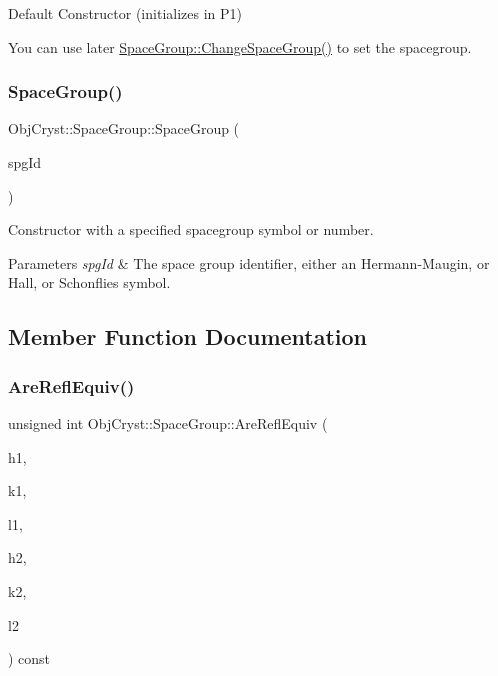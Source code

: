Default Constructor (initializes in P1)

You can use later \mbox{\hyperlink{class_obj_cryst_1_1_space_group_af592aa42f04d02e4caecbf2b93031be8}{Space\+Group\+::\+Change\+Space\+Group()}} to set the spacegroup. \mbox{\label{class_obj_cryst_1_1_space_group_a5db1daaae23fab45637555f74c705b3e}} 
\subsubsection{\texorpdfstring{SpaceGroup()}{SpaceGroup()}\hspace{0.1cm}{\footnotesize\ttfamily [2/2]}}
{\footnotesize\ttfamily Obj\+Cryst\+::\+Space\+Group\+::\+Space\+Group (\begin{DoxyParamCaption}\item[{const string \&}]{spg\+Id }\end{DoxyParamCaption})}



Constructor with a specified spacegroup symbol or number. 


\begin{DoxyParams}{Parameters}
{\em spg\+Id} & The space group identifier, either an Hermann-\/\+Maugin, or Hall, or Schonflies symbol. \\
\hline
\end{DoxyParams}


\subsection{Member Function Documentation}
\mbox{\label{class_obj_cryst_1_1_space_group_a97ca9db1202aa1ff1d61458f25c8acaa}} 
\subsubsection{\texorpdfstring{AreReflEquiv()}{AreReflEquiv()}}
{\footnotesize\ttfamily unsigned int Obj\+Cryst\+::\+Space\+Group\+::\+Are\+Refl\+Equiv (\begin{DoxyParamCaption}\item[{const R\+E\+AL}]{h1,  }\item[{const R\+E\+AL}]{k1,  }\item[{const R\+E\+AL}]{l1,  }\item[{const R\+E\+AL}]{h2,  }\item[{const R\+E\+AL}]{k2,  }\item[{const R\+E\+AL}]{l2 }\end{DoxyParamCaption}) const}

